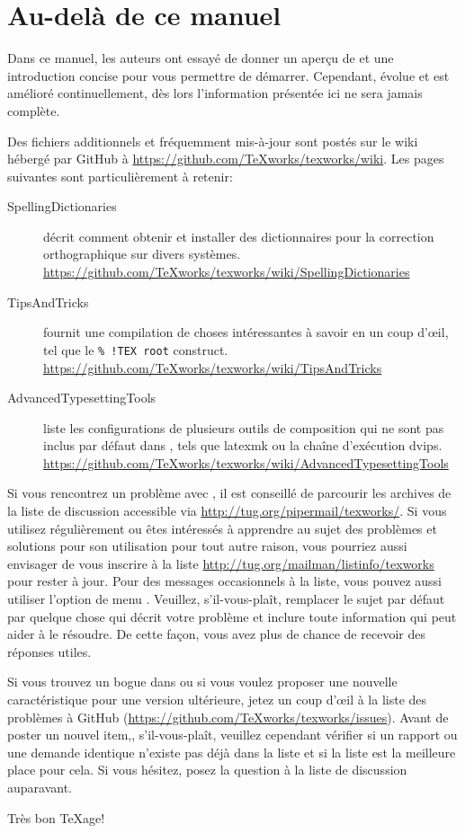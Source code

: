 
\chapter{Au-del{\`a} de ce manuel}

Dans ce manuel, les auteurs ont essayé de donner un aperçu de \Tw{} et une introduction concise pour vous permettre de démarrer. Cependant, \Tw{} évolue et est amélioré continuellement, dès lors l'information présentée ici ne sera jamais complète.

Des fichiers additionnels et fréquemment mis-à-jour sont postés sur le wiki hébergé par GitHub à \url{https://github.com/TeXworks/texworks/wiki}. Les pages suivantes sont particulièrement à retenir:
\begin{description}
\item[SpellingDictionaries] décrit comment obtenir et installer des dictionnaires pour la correction orthographique sur divers systèmes. \url{https://github.com/TeXworks/texworks/wiki/SpellingDictionaries}
\item[TipsAndTricks] fournit une compilation de choses intéressantes à savoir en un coup d'œil, tel que le \verb|% !TEX root| construct. \url{https://github.com/TeXworks/texworks/wiki/TipsAndTricks}
\item[AdvancedTypesettingTools] liste les configurations de plusieurs outils de composition qui ne sont pas inclus par défaut dans \Tw, tels que latexmk ou la chaîne d'exécution dvips. \url{https://github.com/TeXworks/texworks/wiki/AdvancedTypesettingTools}
\end{description}

Si vous rencontrez un problème avec \Tw, il est conseillé de parcourir les archives de la liste de discussion accessible via \url{http://tug.org/pipermail/texworks/}. Si vous utilisez \Tw{} régulièrement ou êtes intéressés à apprendre au sujet des problèmes et solutions pour son utilisation pour tout autre raison, vous pourriez aussi envisager de vous inscrire à la liste \url{http://tug.org/mailman/listinfo/texworks} pour rester à jour. Pour des messages occasionnels à la liste, vous pouvez aussi utiliser l'option de menu \submenu{}. Veuillez, s'il-vous-plaît, remplacer le sujet par défaut par quelque chose qui décrit votre problème et inclure toute information qui peut aider à le résoudre. De cette façon, vous avez plus de chance de recevoir des réponses utiles.

Si vous trouvez un bogue dans \Tw{} ou si vous voulez proposer une nouvelle caractéristique pour une version ultérieure, jetez un coup d'œil à la liste des problèmes à GitHub (\url{https://github.com/TeXworks/texworks/issues}). Avant de poster un nouvel item,, s'il-vous-plaît, veuillez cependant vérifier si un rapport ou une demande identique n'existe pas déjà dans la liste et si la liste est la meilleure place pour cela. Si vous hésitez, posez la question à la liste de discussion auparavant.

Très bon \TeX{}age!

